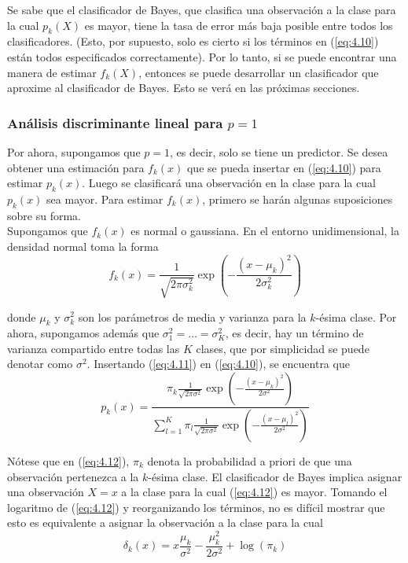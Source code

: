 Se sabe que el clasificador de Bayes, que clasifica una observación a la clase para la cual $p_k(X)$ es mayor, tiene la tasa de error más baja posible entre todos los clasificadores. (Esto, por supuesto, solo es cierto si los términos en (\ref{eq:4.10}) están todos especificados correctamente). Por lo tanto, si se puede encontrar una manera de estimar $f_k(X)$, entonces se puede desarrollar un clasificador que aproxime al clasificador de Bayes. Esto se verá en las próximas secciones.

\subsubsection{Análisis discriminante lineal para $p = 1$}

Por ahora, supongamos que $p = 1$, es decir, solo se tiene un predictor. Se desea obtener una estimación para $f_k(x)$ que se pueda insertar en (\ref{eq:4.10}) para estimar $p_k(x)$. Luego se clasificará una observación en la clase para la cual $p_k(x)$ sea mayor. Para estimar $f_k(x)$, primero se harán algunas suposiciones sobre su forma. \\

Supongamos que $f_k(x)$ es normal o gaussiana. En el entorno unidimensional, la densidad normal toma la forma
\begin{equation}
f_k(x) = \frac{1}{\sqrt{2\pi\sigma^2_k}} \exp\left(-\frac{(x - \mu_k)^2}{2\sigma^2_k}\right)
\label{eq:4.11}
\end{equation}

donde $\mu_k$ y $\sigma^2_k$ son los parámetros de media y varianza para la $k$-ésima clase. Por ahora, supongamos además que $\sigma^2_1 = \ldots = \sigma^2_K$, es decir, hay un término de varianza compartido entre todas las $K$ clases, que por simplicidad se puede denotar como $\sigma^2$. Insertando (\ref{eq:4.11}) en (\ref{eq:4.10}), se encuentra que
\begin{equation}
p_k(x) = \frac{\pi_k \frac{1}{\sqrt{2\pi\sigma^2}} \exp\left(-\frac{(x - \mu_k)^2}{2\sigma^2}\right)}{\sum_{l=1}^K \pi_l \frac{1}{\sqrt{2\pi\sigma^2}} \exp\left(-\frac{(x - \mu_l)^2}{2\sigma^2}\right)}
\label{eq:4.12}
\end{equation}

Nótese que en (\ref{eq:4.12}), $\pi_k$ denota la probabilidad a priori de que una observación pertenezca a la $k$-ésima clase. El clasificador de Bayes implica asignar una observación $X = x$ a la clase para la cual (\ref{eq:4.12}) es mayor. Tomando el logaritmo de (\ref{eq:4.12}) y reorganizando los términos, no es difícil mostrar que esto es equivalente a asignar la observación a la clase para la cual
\begin{equation}
\delta_k(x) = x \frac{\mu_k}{\sigma^2} - \frac{\mu_k^2}{2\sigma^2} + \log(\pi_k)
\label{eq:4.13}
\end{equation}

